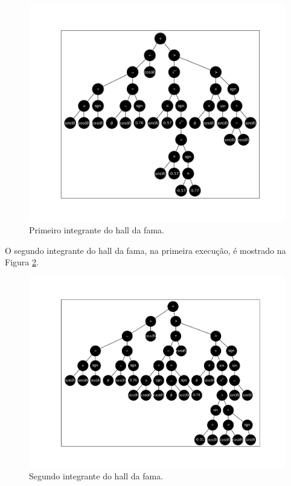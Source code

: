 \begin{figure}[H]
	\centering
	\includegraphics[width=\textwidth]{02_desenvolvimento/04_EC_Fig_PendulumIndiv1.png}
	\caption{Primeiro integrante do hall da fama.}
	\label{fig:4ec-pendulumindiv1}
\end{figure}

O segundo integrante do hall da fama, na primeira execução, é mostrado na Figura \ref{fig:4ec-pendulumindiv2}.

\begin{figure}[H]
	\centering
	\includegraphics[width=\textwidth]{02_desenvolvimento/04_EC_Fig_PendulumIndiv2.png}
	\caption{Segundo integrante do hall da fama.}
	\label{fig:4ec-pendulumindiv2}
\end{figure}

